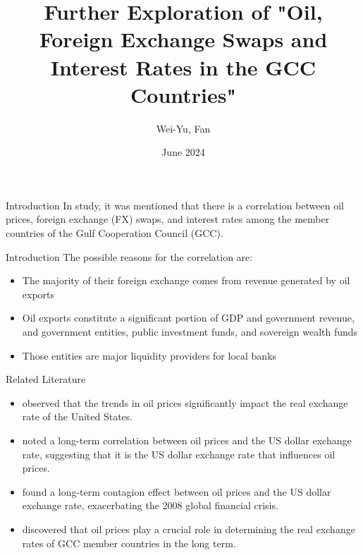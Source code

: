 \documentclass{beamer}
\title[Oil, FX swaps and interst rate]{Further Exploration of "Oil, Foreign Exchange Swaps and Interest Rates in the GCC Countries"}
\author{Wei-Yu, Fan}
\institute[NTU]{Department of Economics, NTU}
\date{June 2024}
\begin{document}
\frame{\titlepage}

\begin{frame}{Introduction}
In \textcite{almaskati2022oil} study, it was mentioned that there is a correlation between oil prices, foreign exchange (FX) swaps, and interest rates among the member countries of the Gulf Cooperation Council (GCC).
\end{frame}

\begin{frame}{Introduction}
The possible reasons for the correlation are:
\begin{itemize}
    \item The majority of their foreign exchange comes from revenue generated by oil exports
    \item Oil exports constitute a significant portion of GDP and government revenue, and government entities, public investment funds, and sovereign wealth funds
    \item Those entities are major liquidity providers for local banks
\end{itemize}
\end{frame}

\begin{frame}{Related Literature}
\begin{itemize}
    \item \textcite{amano1998oil} observed that the trends in oil prices significantly impact the real exchange rate of the United States.
    \item \textcite{zhang2008spillover} noted a long-term correlation between oil prices and the US dollar exchange rate, suggesting that it is the US dollar exchange rate that influences oil prices.
    \item \textcite{reboredo2014oil} found a long-term contagion effect between oil prices and the US dollar exchange rate, exacerbating the 2008 global financial crisis.
    \item \textcite{eslamloueyan2015determinants} discovered that oil prices play a crucial role in determining the real exchange rates of GCC member countries in the long term.
\end{itemize}
\end{frame}
\end{document}
